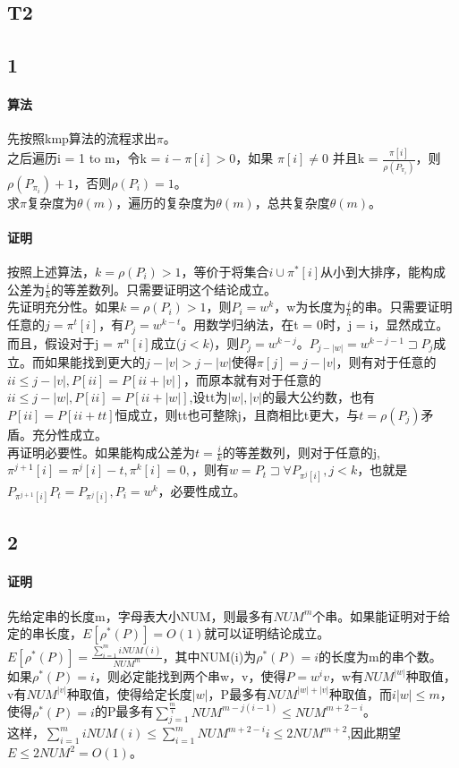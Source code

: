 \documentclass{article}
\begin{document}
\begin{CJK}{UTF8}{gkai}
\section{T2}
\subsection{1}
\paragraph{算法}
先按照kmp算法的流程求出$\pi$。\\
之后遍历i = 1 to m，令k = $i - \pi[i] > 0$，如果 $\pi[i] \neq 0$ 并且k = $\frac{\pi[i]}{\rho(P_{\pi_{i}})}$，则 $\rho(P_{\pi_{i}}) + 1$，否则$\rho(P_{i}) = 1$。\\
求$\pi$复杂度为$\theta(m)$，遍历的复杂度为$\theta(m)$，总共复杂度$\theta(m)$。
\paragraph{证明}
按照上述算法，$k = \rho(P_{i}) > 1$，等价于将集合$i\cup \pi^{*}[i]$从小到大排序，能构成公差为$\frac{i}{k}$的等差数列。只需要证明这个结论成立。\\
先证明充分性。如果$k = \rho(P_{i}) > 1$，则$P_{i}=w^{k}$，w为长度为$\frac{i}{k}$的串。只需要证明任意的$j = \pi^{t}[i]$，有$P_{j} = w^{k - t}$。用数学归纳法，在t = 0时，j = i，显然成立。而且，假设对于j = $\pi^{n}[i]$成立($j < k$)，则$P_{j} = w^{k-j}$。$P_{j-|w|} = w^{k-j-1}\sqsupset P_{j}$成立。而如果能找到更大的$j - |v| > j - |w|$使得$\pi[j] = j - |v|$，则有对于任意的$ii \leq j - |v|,P[ii]=P[ii+|v|]$，而原本就有对于任意的$ii \leq j - |w|,P[ii]=P[ii+|w|]$,设tt为$|w|,|v|$的最大公约数，也有$P[ii]=P[ii+tt]$恒成立，则tt也可整除j，且商相比t更大，与$t = \rho(P_{j})$矛盾。充分性成立。\\
再证明必要性。如果能构成公差为$t = \frac{i}{k}$的等差数列，则对于任意的j,$\pi^{j+1}[i]=\pi^{j}[i] - t,\pi^{k}[i]=0,$，则有$w = P_{t}\sqsupset \forall P_{\pi^{j}[i]},j < k$，也就是$P_{\pi^{j+1}[i]}P_{t}=P_{\pi^{j}[i]},P_{i}=w^{k}$，必要性成立。\\
\subsection{2}
\paragraph{证明}
先给定串的长度m，字母表大小NUM，则最多有$NUM^{m}$个串。如果能证明对于给定的串长度，$E[\rho^{*}(P)] = O(1)$就可以证明结论成立。\\
$E[\rho^{*}(P)] = \frac{\sum_{i = 1}^{m} iNUM(i)}{NUM^{m}}$，其中NUM(i)为$\rho^{*}(P)=i$的长度为m的串个数。\\
如果$\rho^{*}(P)=i$，则必定能找到两个串w，v，使得$P = w^{i}v$，w有$NUM^{|w|}$种取值，v有$NUM^{|v|}$种取值，使得给定长度$|w|$，P最多有$NUM^{|w|+|v|}$种取值，而$i|w|\leq m$，使得$\rho^{*}(P)=i$的P最多有$\sum_{j=1}^{\frac{m}{i}}NUM^{m-j(i-1)}\leq NUM^{m+2-i}$。\\
这样，$\sum_{i = 1}^{m} iNUM(i)\leq \sum_{i=1}^{m}NUM^{m+2-i}i \leq 2NUM^{m+2}$,因此期望$E\leq 2NUM^{2} = O(1)$。

\end{CJK}
\end{document}
